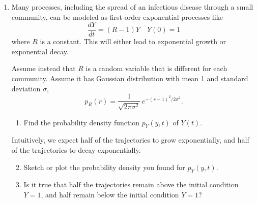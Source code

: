 \documentclass[12pt,letterpaper]{article}
\begin{document}
\begin{enumerate}







\item Many processes, including the spread of an infectious disease through a small community, can be modeled as first-order exponential processes like
\begin{equation*}
\frac{dY}{dt} = \left(R-1\right) Y \quad Y(0)=1
\end{equation*}
where $R$ is a constant. This will either lead to exponential growth or exponential decay.

Assume instead that $R$ is a random variable that is different for each community. Assume it has Gaussian distribution with mean 1 and standard deviation $\sigma$,
\begin{equation*}
p_R(r) = \frac{1}{\sqrt{2\pi \sigma^2}}\, e^{-\left(r-1\right)^2/2\sigma^2}.
\end{equation*}

\begin{enumerate}
\item Find the probability density function $p_Y(y,t)$ of $Y(t)$.
\end{enumerate}

Intuitively, we expect half of the trajectories to grow exponentially, and half of the trajectories to decay exponentially.

\begin{enumerate}
\setcounter{enumii}{1}
\item Sketch or plot the probability density you found for $p_Y(y,t)$.
\item Is it true that half the trajectories remain above the initial condition $Y=1$, and half remain below the initial condition $Y=1$? 
\end{enumerate}


\end{enumerate}
\end{document}
